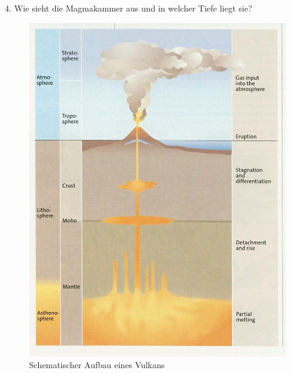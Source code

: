 \documentclass[xcolor=dvipsnames]{beamer}
\begin{document}
\begin{frame}[t]{}
\begin{block}{\LARGE 4. Wie sieht die Magmakammer aus und in welcher Tiefe liegt sie?}
\begin{minipage}{0.27\textwidth}
\begin{figure}
   \includegraphics[scale=0.97]{images/8.jpg}
           \caption{\Large Schematischer Aufbau eines Vulkans}
   \end{figure}
  \end{minipage}
  \hfill
  \begin{minipage}{0.3\textwidth}
  \begin{figure}

\end{figure}
\end{minipage}
\end{block}
\end{frame}
\end{document}
